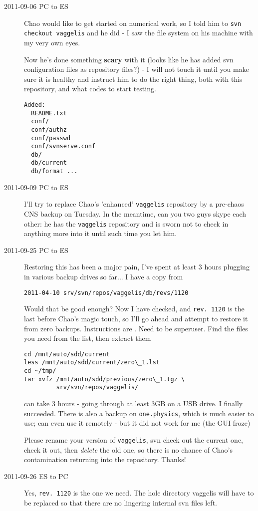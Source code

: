 \begin{description}
\item[2011-09-06 PC to ES]
Chao would like to get started on numerical work, so I told him to
    \texttt{svn checkout vaggelis}
and he did - I saw the file system on his machine with my very own eyes.

Now he's done something \textbf{scary} with it (looks like he has added svn configuration
files as repository files?) - I will not touch it until you make sure it is healthy and
instruct him to do the right thing, both with this repository, and what codes to start
testing.

\begin{verbatim}
Added:
  README.txt
  conf/
  conf/authz
  conf/passwd
  conf/svnserve.conf
  db/
  db/current
  db/format ...
\end{verbatim}

\item[2011-09-09 PC to ES]
I'll try to replace Chao's 'enhanced' \texttt{vaggelis} repository by a
pre-chaos CNS backup on Tuesday. In the meantime, can you two guys skype
each other: he has the \texttt{vaggelis} repository and is sworn not to
check in anything more into it until such time you let him.

\item[2011-09-25 PC to ES]
Restoring this has been a major pain, I've spent at least 3 hours
plugging in various backup drives so far... I have a copy from
\begin{verbatim}
2011-04-10 srv/svn/repos/vaggelis/db/revs/1120
\end{verbatim}
Would that be good enough?
Now I have checked, and \texttt{rev. 1120} is the last before Chao's 
magic touch,
so I'll go ahead and attempt to restore it from zero backups. Instructions
are . 
Need to be superuser.
Find the files you need from the list, then extract them
\begin{verbatim}
cd /mnt/auto/sdd/current
less /mnt/auto/sdd/current/zero\_1.lst
cd ~/tmp/
tar xvfz /mnt/auto/sdd/previous/zero\_1.tgz \
         srv/svn/repos/vaggelis/
\end{verbatim}
can take 3 hours - going through at least 3GB on a USB drive.
I finally succeeded. There is also a backup on \texttt{one.physics},
which is much easier to use; can even use
it remotely - but it did not work for me (the GUI froze)

Please rename your version of \texttt{vaggelis}, svn check out the
current one, check it out, then {\em delete} the old one, 
so there is no chance of Chao's contamination returning into the repository.
Thanks!

\item[2011-09-26 ES to PC]

Yes, \texttt{rev. 1120} is the one we need. The hole directory vaggelis will have
to be replaced so that there are no lingering internal svn files left.

\end{description}

